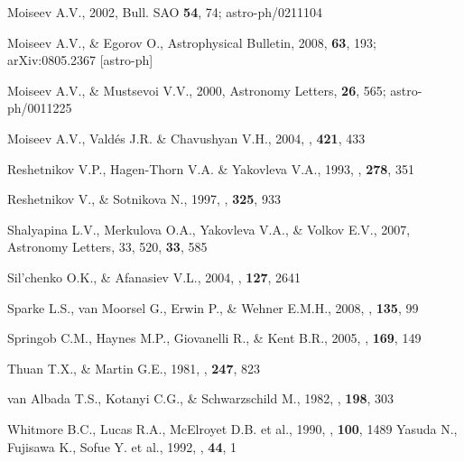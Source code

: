 \documentclass{ab}
\begin{document}
\begin{thebibliography}{}
Moiseev A.V., 2002, Bull. SAO  {\bf 54}, 74; astro-ph/0211104

Moiseev A.V., \& Egorov O., Astrophysical Bulletin, 2008, \textbf{63}, 193; arXiv:0805.2367 [astro-ph]

Moiseev A.V., \& Mustsevoi V.V., 2000, Astronomy Letters, {\bf 26}, 565; astro-ph/0011225

 Moiseev A.V., Vald{\' e}s J.R. \& Chavushyan V.H., 2004, \aap, \textbf{421}, 433

Reshetnikov V.P., Hagen-Thorn V.A. \&  Yakovleva V.A., 1993, \aap, {\bf 278}, 351

Reshetnikov V., \& Sotnikova N., 1997, \aap, \textbf{325}, 933

Shalyapina L.V., Merkulova O.A., Yakovleva V.A., \&
Volkov E.V., 2007, Astronomy Letters, 33, 520,  \textbf{33}, 585 

Sil'chenko O.K., \& Afanasiev V.L., 2004, \aj, \textbf{127}, 2641

Sparke L.S., van Moorsel G., Erwin  P., \& Wehner E.M.H., 2008, \aj, \textbf{135}, 99

Springob C.M., Haynes M.P., Giovanelli R., \& Kent  B.R., 2005, \apjs, \textbf{169}, 149

Thuan T.X., \& Martin  G.E., 1981, \apj, \textbf{247}, 823

van Albada T.S., Kotanyi C.G., \&  Schwarzschild M., 1982, \mnras, \textbf{198}, 303

Whitmore B.C., Lucas R.A., McElroyet D.B. et al., 1990, \aj, \textbf{100}, 1489
Yasuda N., Fujisawa K., Sofue Y. et al., 1992, \pasj, \textbf{44}, 1


\end{thebibliography}
\end{document}
